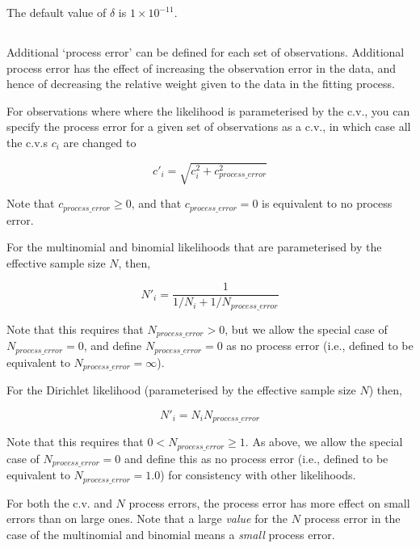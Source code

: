 {{{{{{The default value of $\delta$ is $1 \times 10^{-11}$.

\subsection{}

Additional `process error' can be defined for each set of observations. Additional process error has the effect of increasing the observation error in the data, and hence of decreasing the relative weight given to the data in the fitting process. 

For observations where where the likelihood is parameterised by the c.v., you can specify the process error for a given set of observations as a c.v., in which case all the c.v.s $c_i$ are changed to

\begin{equation}
  c'_i  = \sqrt {c_i^2  + c_{process\_error}^2 } 
\end{equation}

Note that $c_{process\_ error} \ge 0$, and that $c_{process\_ error} = 0$ is equivalent to no process error.

For the multinomial and binomial likelihoods that are parameterised by the effective sample size $N$, then,

\begin{equation}
 N'_i  = \frac{1}{1 / {N_i}+ 1 / N_{process\_error}}
\end{equation}

Note that this requires that $N_{process\_ error} > 0$, but we allow the special case of $N_{process\_ error}=0$, and define $N_{process\_ error}=0$ as no process error (i.e., defined to be equivalent to $N_{process\_ error}=\infty$). 

For the Dirichlet likelihood (parameterised by the effective sample size $N$) then,

\begin{equation}
 N'_i  = N_i N_{process\_error}
\end{equation}

Note that this requires that $0 < N_{process\_ error} \ge 1$. As above, we allow the special case of $N_{process\_ error}=0$ and define this as no process error (i.e., defined to be equivalent to $N_{process\_ error}=1.0$) for consistency with other likelihoods.

For both the c.v. and $N$ process errors, the process error has more effect on small errors than on large ones. Note that a large \emph{value} for the $N$ process error in the case of the multinomial and binomial means a \emph{small} process error.

}}}}}}

